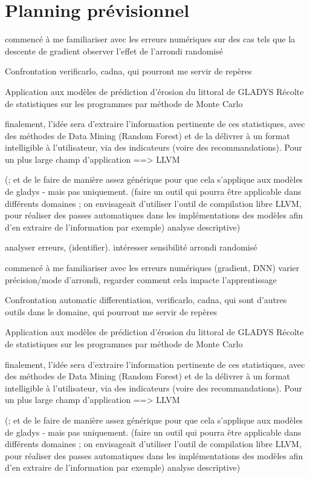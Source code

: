 \documentclass[a4paper,11pt]{article}
\begin{document}
\section{Planning prévisionnel}

commencé à me familiariser avec les erreurs numériques sur des cas tels que la descente de gradient
observer l’effet de l’arrondi randomisé

Confrontation
verificarlo, cadna, qui pourront me servir de repères

Application aux modèles de prédiction d’érosion du littoral de GLADYS
Récolte de statistiques sur les programmes par méthode de Monte Carlo

finalement, l’idée sera d’extraire l’information pertinente de ces statistiques, avec des méthodes de Data Mining (Random Forest)
et de la délivrer à un format intelligible à l’utilisateur, via des indicateurs (voire des recommandations).
Pour un plus large champ d’application  ==> LLVM

 (; et de le faire de manière assez générique pour que cela s’applique aux modèles de gladys - mais pas uniquement.
(faire un outil qui pourra être applicable dans différents domaines ; on envisageait d’utiliser l’outil de compilation libre LLVM, pour réaliser des passes automatiques dans les implémentations des modèles afin d’en extraire de l’information par exemple)
analyse descriptive)


analyser erreurs, (identifier).
intéresser sensibilité arrondi randomisé

commencé à me familiariser avec les erreurs numériques (gradient, DNN)
varier précision/mode d’arrondi, regarder comment cela impacte l’apprentissage

Confrontation
automatic differentiation, verificarlo, cadna, qui sont d’autres outils dans le domaine, qui pourront me servir de repères

Application aux modèles de prédiction d’érosion du littoral de GLADYS
Récolte de statistiques sur les programmes par méthode de Monte Carlo

finalement, l’idée sera d’extraire l’information pertinente de ces statistiques, avec des méthodes de Data Mining (Random Forest)
et de la délivrer à un format intelligible à l’utilisateur, via des indicateurs (voire des recommandations).
Pour un plus large champ d’application ==> LLVM

 (; et de le faire de manière assez générique pour que cela s’applique aux modèles de gladys - mais pas uniquement.
(faire un outil qui pourra être applicable dans différents domaines ; on envisageait d’utiliser l’outil de compilation libre LLVM, pour réaliser des passes automatiques dans les implémentations des modèles afin d’en extraire de l’information par exemple)
analyse descriptive)
\end{document}
